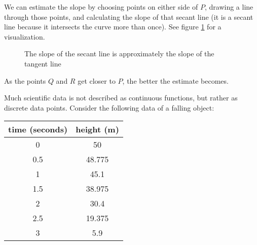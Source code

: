 We can estimate the slope by choosing points on either side of $P$, drawing a 
line through those points, and calculating the slope of that secant line (it 
is a secant line because it intersects the curve more than once). See figure 
\ref{fig:secant} for a visualization. 

\begin{figure}[htbp]
    \centering
    \caption{The slope of the secant line is approximately the slope of the 
    tangent line}
    \label{fig:secant}
\end{figure}

As the points $Q$ and $R$ get closer to $P$, the better the estimate becomes. 

Much scientific data is not described as continuous functions, but rather as 
discrete data points. Consider the following data of a falling object:
\begin{center}
\begin{tabular}{|c|c|}
\hline
time (seconds) & height (m)\\\hline
0 & 50\\\hline
0.5 & 48.775\\\hline
1 & 45.1\\\hline
1.5 & 38.975\\\hline
2 & 30.4\\\hline
2.5 & 19.375\\\hline
3 & 5.9 \\\hline
\end{tabular}
\end{center}


